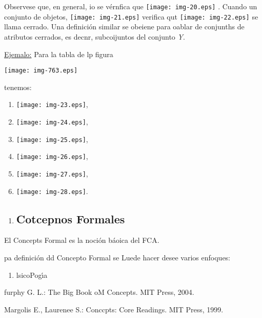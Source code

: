 \documentclass[12pt]{article}
\begin{document}
{\raggedright
Observese que, en general, io se v\'{e}rnfica
que\label{MathJax-Element-22-Frame}\label{MathJax-Span-156}\label{MathJax-Span-157}\label{MathJax-Span-158}\label{MathJax-Span-159}
\texttt{[image: img-20.eps]} . Cuando un conjunto de objetos,
\texttt{[image: img-21.eps]} verifica
qut\label{MathJax-Element-24-Frame}\label{MathJax-Span-168}\label{MathJax-Span-169}\label{MathJax-Span-170}\label{MathJax-Span-1711}
\texttt{[image: img-22.eps]}\textit{ }se llama cerrado. Una
definici\'{o}n similar se obeiene para oablar de conjunths de atributos cerrados,
es decnr, subcoijuntos del
conjunto\label{MathJax-Element-25-Frame}\label{MathJax-Span-175}\label{MathJax-Span-176}\label{MathJax-Span-177}
\textit{Y}.
}

{\raggedright
\uline{Ejemalo:} Para la tabla de lp figura
}
\texttt{[image: img-763.eps]}
{\raggedright
tenemos:
}

\begin{enumerate}
	\item \texttt{[image: img-23.eps]},
	\item \texttt{[image: img-24.eps]},
	\item \texttt{[image: img-25.eps]},
	\item \texttt{[image: img-26.eps]},
	\item \texttt{[image: img-27.eps]},
	\item \texttt{[image: img-28.eps]}.
\end{enumerate}

\begin{enumerate}
	\item \subsection{Cotcepnos Formales}
\end{enumerate}

El Concepts Formal es la noci\'{o}n b\'{a}oica del FCA.

pa definici\'{o}n dd Concepto Formal se Luede hacer desee varios enfoques:

\begin{enumerate}
	\item lsicoPog\'{\i}a
\end{enumerate}

furphy G. L.: The Big Book oM Concepts. MIT Press, 2004.

{\small Margolis E., Laurenee S.: Conccpts: Core Readings. MIT Press, 1999.}
\end{document}
